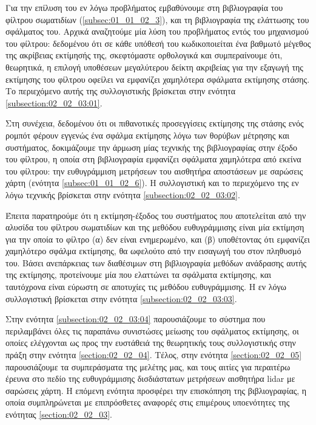 Για την επίλυση του εν λόγω προβλήματος εμβαθύνουμε στη βιβλιογραφία του
φίλτρου σωματιδίων (\ref{subsec:01_01_02_3}), και τη βιβλιογραφία της ελάττωσης
του σφάλματος του. Αρχικά αναζητούμε μία λύση του προβλήματος εντός του
μηχανισμού του φίλτρου: δεδομένου ότι σε κάθε υπόθεσή του κωδικοποιείται ένα
βαθμωτό μέγεθος της ακρίβειας εκτίμησής της, σκεφτόμαστε ορθολογικά και
συμπεραίνουμε ότι, θεωρητικά, η επιλογή υποθέσεων μεγαλύτερου δείκτη ακριβείας
για την εξαγωγή της εκτίμησης του φίλτρου οφείλει να εμφανίζει χαμηλότερα
σφάλματα εκτίμησης στάσης. Το περιεχόμενο αυτής της συλλογιστικής βρίσκεται
στην ενότητα \ref{subsection:02_02_03:01}.

Στη συνέχεια, δεδομένου ότι οι πιθανοτικές προσεγγίσεις εκτίμησης της στάσης
ενός ρομπότ φέρουν εγγενώς ένα σφάλμα εκτίμησης λόγω των θορύβων μέτρησης και
συστήματος, δοκιμάζουμε την άρμωση μίας τεχνικής της βιβλιογραφίας στην έξοδο
του φίλτρου, η οποία στη βιβλιογραφία εμφανίζει σφάλματα χαμηλότερα από εκείνα
του φίλτρου: την ευθυγράμμιση μετρήσεων του αισθητήρα αποστάσεων με σαρώσεις
χάρτη (ενότητα \ref{subsec:01_01_02_6}). Η συλλογιστική και το περιεχόμενο της
εν λόγω τεχνικής βρίσκεται στην ενότητα \ref{subsection:02_02_03:02}.

Έπειτα παρατηρούμε ότι η εκτίμηση-έξοδος του συστήματος που αποτελείται από
την αλυσίδα του φίλτρου σωματιδίων και της μεθόδου ευθυγράμμισης είναι μία
εκτίμηση για την οποία το φίλτρο (α) δεν είναι ενημερωμένο, και (β) υποθέτοντας
ότι εμφανίζει χαμηλότερο σφάλμα εκτίμησης, θα ωφελούτο από την εισαγωγή του
στον πληθυσμό του. Βάσει ανεπάρκειας των διαθέσιμων στη βιβλιογραφία μεθόδων
ανάδρασης αυτής της εκτίμησης, προτείνουμε μία που ελαττώνει τα σφάλματα
εκτίμησης, και ταυτόχρονα είναι εύρωστη σε αποτυχίες τις μεθόδου ευθυγράμμισης.
Η εν λόγω συλλογιστική βρίσκεται στην ενότητα \ref{subsection:02_02_03:03}.

Στην ενότητα \ref{subsection:02_02_03:04} παρουσιάζουμε το σύστημα που
περιλαμβάνει όλες τις παραπάνω συνιστώσες μείωσης του σφάλματος εκτίμησης, οι
οποίες ελέγχονται ως προς την ευστάθειά της θεωρητικής τους συλλογιστικής στην
πράξη στην ενότητα \ref{section:02_02_04}. Τέλος, στην ενότητα
\ref{section:02_02_05} παρουσιάζουμε τα συμπεράσματα της μελέτης μας, και τους
αιτίες για περαιτέρω έρευνα στο πεδίο της ευθυγράμμισης δισδιάστατων μετρήσεων
αισθητήρα lidar με σαρώσεις χάρτη. Η επόμενη ενότητα προσφέρει την επισκόπηση
της βιβλιογραφίας, η οποία συμπληρώνεται με επιπρόσθετες αναφορές στις
επιμέρους υποενότητες της ενότητας \ref{section:02_02_03}.
